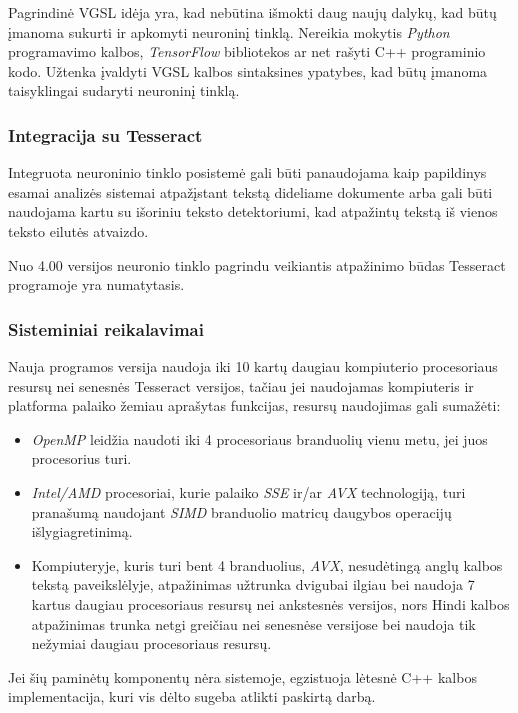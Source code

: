 \documentclass{VUMIFInfBakalaurinis}
\begin{document}
Pagrindinė VGSL idėja yra, kad nebūtina išmokti daug naujų dalykų, kad būtų įmanoma sukurti ir apkomyti neuroninį tinklą.
Nereikia mokytis \textit{Python} programavimo kalbos, \textit{TensorFlow} bibliotekos ar net rašyti C++ programinio kodo.
Užtenka įvaldyti VGSL kalbos sintaksines ypatybes, kad būtų įmanoma taisyklingai sudaryti neuroninį tinklą.

\subsubsection{Integracija su Tesseract}
Integruota neuroninio tinklo posistemė gali būti panaudojama kaip papildinys esamai analizės sistemai atpažįstant tekstą dideliame dokumente arba
gali būti naudojama kartu su išoriniu teksto detektoriumi, kad atpažintų tekstą iš vienos teksto eilutės atvaizdo.

Nuo 4.00 versijos neuronio tinklo pagrindu veikiantis atpažinimo būdas Tesseract programoje yra numatytasis. 

\subsubsection{Sisteminiai reikalavimai}
Nauja programos versija naudoja iki 10 kartų daugiau kompiuterio procesoriaus resursų nei senesnės Tesseract versijos, 
tačiau jei naudojamas kompiuteris ir platforma palaiko žemiau aprašytas funkcijas, resursų naudojimas gali sumažėti:

\begin{itemize}
  \item \textit{OpenMP} leidžia naudoti iki 4 procesoriaus branduolių vienu metu, jei juos procesorius turi.
  \item \textit{Intel/AMD} procesoriai, kurie palaiko \textit{SSE} ir/ar \textit{AVX} technologiją, turi pranašumą naudojant \textit{SIMD} branduolio matricų daugybos operacijų išlygiagretinimą.
  \item Kompiuteryje, kuris turi bent 4 branduolius, \textit{AVX}, nesudėtingą anglų kalbos tekstą paveikslėlyje, atpažinimas užtrunka dvigubai ilgiau bei naudoja 7 kartus daugiau procesoriaus resursų nei ankstesnės versijos, nors Hindi kalbos atpažinimas trunka netgi greičiau nei senesnėse versijose bei naudoja tik nežymiai daugiau procesoriaus resursų.
\end{itemize}

Jei šių paminėtų komponentų nėra sistemoje, egzistuoja lėtesnė C++ kalbos implementacija, kuri vis dėlto sugeba atlikti paskirtą darbą.
\end{document}

